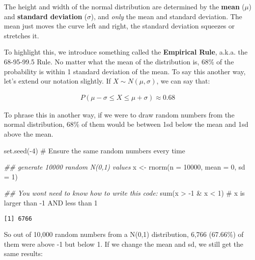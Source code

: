 \documentclass[
  letterpaper,
  DIV=11,
  numbers=noendperiod]{scrreprt}
\newenvironment{Shaded}{\begin{snugshade}}{\end{snugshade}}
\newcommand{\AttributeTok}[1]{\textcolor[rgb]{0.40,0.45,0.13}{#1}}
\newcommand{\CommentTok}[1]{\textcolor[rgb]{0.37,0.37,0.37}{#1}}
\newcommand{\DecValTok}[1]{\textcolor[rgb]{0.68,0.00,0.00}{#1}}
\newcommand{\DocumentationTok}[1]{\textcolor[rgb]{0.37,0.37,0.37}{\textit{#1}}}
\newcommand{\FunctionTok}[1]{\textcolor[rgb]{0.28,0.35,0.67}{#1}}
\newcommand{\NormalTok}[1]{\textcolor[rgb]{0.00,0.23,0.31}{#1}}
\newcommand{\OtherTok}[1]{\textcolor[rgb]{0.00,0.23,0.31}{#1}}
\newcommand{\SpecialCharTok}[1]{\textcolor[rgb]{0.37,0.37,0.37}{#1}}
\begin{document}
The height and width of the normal distribution are determined by the
\textbf{mean} (\(\mu\)) and \textbf{standard deviation} (\(\sigma\)),
and \emph{only} the mean and standard deviation. The mean just moves the
curve left and right, the standard deviation squeezes or stretches it.

To highlight this, we introduce something called the \textbf{Empirical
Rule}, a.k.a. the 68-95-99.5 Rule. No matter what the mean of the
distribution is, 68\% of the probability is within 1 standard deviation
of the mean. To say this another way, let's extend our notation
slightly. If \(X\sim N(\mu,\sigma)\), we can say that:

\begin{align*}
P(\mu - \sigma \le X \le \mu + \sigma) \approx 0.68
\end{align*}

To phrase this in another way, if we were to draw random numbers from
the normal distribution, 68\% of them would be between 1sd below the
mean and 1sd above the mean.

\begin{Shaded}
\begin{Highlighting}[]
\FunctionTok{set.seed}\NormalTok{(}\SpecialCharTok{{-}}\DecValTok{4}\NormalTok{) }\CommentTok{\# Ensure the same random numbers every time}

\DocumentationTok{\#\# generate 10000 random N(0,1) values}
\NormalTok{x }\OtherTok{\textless{}{-}} \FunctionTok{rnorm}\NormalTok{(}\AttributeTok{n =} \DecValTok{10000}\NormalTok{, }\AttributeTok{mean =} \DecValTok{0}\NormalTok{, }\AttributeTok{sd =} \DecValTok{1}\NormalTok{) }

\DocumentationTok{\#\# You won\textquotesingle{}t need to know how to write this code:}
\FunctionTok{sum}\NormalTok{(x }\SpecialCharTok{\textgreater{}} \SpecialCharTok{{-}}\DecValTok{1} \SpecialCharTok{\&}\NormalTok{ x }\SpecialCharTok{\textless{}} \DecValTok{1}\NormalTok{) }\CommentTok{\# x is larger than {-}1 AND less than 1}
\end{Highlighting}
\end{Shaded}

\begin{verbatim}
[1] 6766
\end{verbatim}

So out of 10,000 random numbers from a N(0,1) distribution, 6,766
(67.66\%) of them were above -1 but below 1. If we change the mean and
sd, we still get the same results:
\end{document}
